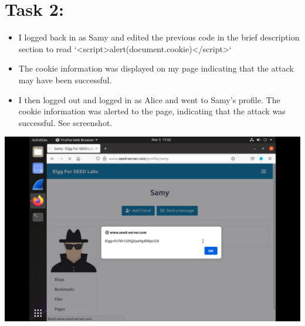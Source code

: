 \documentclass[11pt]{article}
\begin{document}
\section*{Task 2:}
\label{sec:org5b16a27}
\begin{itemize}
\item I logged back in as Samy and edited the previous code in the brief description section to read `<script>alert(document.cookie)</script>`
\item The cookie information was displayed on my page indicating that the attack may have been successful.
\item I then logged out and logged in as Alice and went to Samy's profile. The cookie information was alerted to the page, indicating that the attack was successful. See screenshot.
\end{itemize}
\begin{center}
\includegraphics[width=.9\linewidth]{./images/1.jpg}
\end{center}
\end{document}
